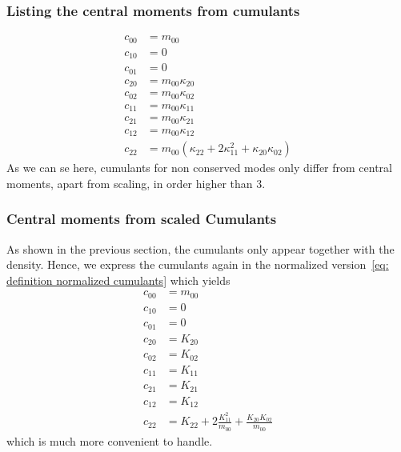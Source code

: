 \documentclass{article}
\begin{document}
\subsubsection{Listing the central moments from cumulants}
\label{subs:Listing the central moments from cumulants}
\begin{equation}
  \label{eq:all central moments from cumulants}
  \begin{aligned}
    c_{00} & = m_{00} \\
    c_{10} & = 0 \\
    c_{01} & = 0 \\
    c_{20} & = m_{00}\kappa_{20} \\
    c_{02} & = m_{00}\kappa_{02} \\
    c_{11} & = m_{00}\kappa_{11} \\
    c_{21} & = m_{00}\kappa_{21} \\
    c_{12} & = m_{00}\kappa_{12} \\
    c_{22} & = m_{00}(\kappa_{22} + 2\kappa_{11}^2 + \kappa_{20}\kappa_{02})
  \end{aligned}
\end{equation}
As we can se here, cumulants for non conserved modes only differ from central moments, apart from scaling, in order higher than $3$.

\subsubsection{Central moments from scaled Cumulants}
\label{subs:Central moments from scaled Cumulants}

As shown in the previous section, the cumulants only appear together with the density. Hence, we express the cumulants again in the normalized version~\eqref{eq: definition normalized cumulants} which yields
\begin{equation}
  \label{eq:all central moments from normalized cumulants}
  \begin{aligned}
    c_{00} & = m_{00}\\
    c_{10} & = 0 \\
    c_{01} & = 0 \\
    c_{20} & = K_{20} \\
    c_{02} & = K_{02} \\
    c_{11} & = K_{11} \\
    c_{21} & = K_{21} \\
    c_{12} & = K_{12} \\
    c_{22} & = K_{22} + 2 \frac{K_{11}^2}{m_{00}} + \frac{K_{20}K_{02}}{m_{00}}
  \end{aligned}
\end{equation}
which is much more convenient to handle.
\end{document}
